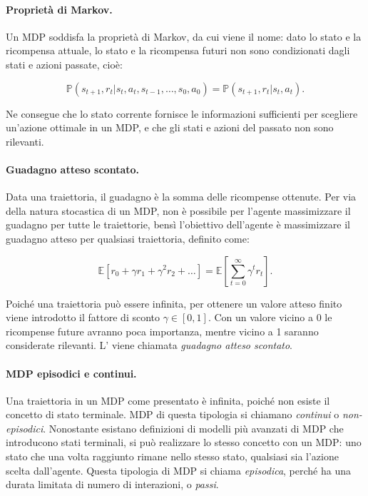 \paragraph{Proprietà di Markov.} Un MDP soddisfa la proprietà di Markov, da cui viene il nome: dato lo stato e la ricompensa attuale, lo stato e la ricompensa futuri non sono condizionati dagli stati e azioni passate, cioè:

\begin{equation}
    \mathbb{P}(s_{t+1}, r_t | s_t, a_t, s_{t-1}, \dots, s_0, a_0) = \mathbb{P}(s_{t+1}, r_t | s_t, a_t).
\end{equation}

Ne consegue che lo stato corrente fornisce le informazioni sufficienti per scegliere un'azione ottimale in un MDP, e che gli stati e azioni del passato non sono rilevanti.

\paragraph{Guadagno atteso scontato.} Data una traiettoria, il guadagno è la somma delle ricompense ottenute. Per via della natura stocastica di un MDP, non è possibile per l'agente massimizzare il guadagno per tutte le traiettorie, bensì l'obiettivo dell'agente è massimizzare il guadagno atteso per qualsiasi traiettoria, definito come:

\begin{equation}\label{eq:2_discounted_return}
    \mathbb{E} \left[ r_0 + \gamma r_1 + \gamma^2 r_2 + \dots \right] = \mathbb{E} \left[ \sum_{t=0}^{\infty} \gamma^t r_t \right].
\end{equation}

Poiché una traiettoria può essere infinita, per ottenere un valore atteso finito viene introdotto il fattore di sconto $\gamma \in [0, 1]$. Con un valore vicino a 0 le ricompense future avranno poca importanza, mentre vicino a 1 saranno considerate rilevanti. L' viene chiamata \textit{guadagno atteso scontato}.

\paragraph{MDP episodici e continui.} Una traiettoria in un MDP come presentato è infinita, poiché non esiste il concetto di stato terminale. MDP di questa tipologia si chiamano \textit{continui} o \textit{non-episodici}. Nonostante esistano definizioni di modelli più avanzati di MDP che introducono stati terminali, si può realizzare lo stesso concetto con un MDP: uno stato che una volta raggiunto rimane nello stesso stato, qualsiasi sia l'azione scelta dall'agente. Questa tipologia di MDP si chiama \textit{episodica}, perché ha una durata limitata di numero di interazioni, o \textit{passi}.


